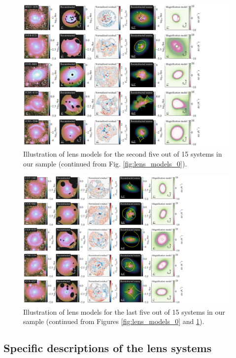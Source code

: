 \documentclass{aa}
\begin{document}
\begin{figure}
	\centering
	\includegraphics[width=1.2\textwidth]{figures/lens_models_1.pdf}
	\caption{\label{fig:lens_models_1}
    Illustration of lens models for the second five out of 15 systems in our sample (continued from Fig. \ref{fig:lens_models_0}).
	}
\end{figure}

\begin{figure}
	\centering
	\includegraphics[width=1.3\textwidth]{figures/lens_models_2.pdf}
	\caption{\label{fig:lens_models_2}
	  Illustration of lens models for the last five out of 15 systems in our sample (continued from Figures \ref{fig:lens_models_0} and \ref{fig:lens_models_1}).
	}
\end{figure}

\subsection{Specific descriptions of the lens 
systems}
\label{ssec:specific_descriptions}
\end{document}
